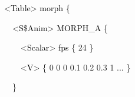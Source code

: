 \documentclass[a4paper]{article}
\newcommand\textstyleOOoComputerKeyWord[1]{\textrm{\textcolor[rgb]{0.0,0.0,0.5019608}{#1}}}
\newcommand\textstyleOOoAssemblerSpecialChar[1]{\textrm{\textcolor[rgb]{0.0,0.5019608,0.0}{#1}}}
\newcommand\textstyleOOoAssemblerIdent[1]{\textrm{\textcolor{black}{#1}}}
\newcommand\textstyleOOoAssemblerLiteral[1]{\textrm{\textcolor[rgb]{0.49803922,0.0,0.49803922}{#1}}}
\begin{document}
{\color{black}
\textstyleOOoComputerKeyWord{\textcolor{black}{\ \ \ \ }}\textstyleOOoAssemblerSpecialChar{{\textless}}\textstyleOOoAssemblerIdent{Table}\textstyleOOoAssemblerSpecialChar{{\textgreater}}\textstyleOOoComputerKeyWord{\textcolor{black}{
}}\textstyleOOoAssemblerIdent{morph}\textstyleOOoComputerKeyWord{\textcolor{black}{
}}\textstyleOOoAssemblerSpecialChar{\{}}

{\color{black}
\textstyleOOoComputerKeyWord{\textcolor{black}{\ \ \ \ \ \ }}\textstyleOOoAssemblerSpecialChar{{\textless}}\textstyleOOoAssemblerIdent{S}\textstyleOOoAssemblerSpecialChar{\$}\textstyleOOoAssemblerIdent{Anim}\textstyleOOoAssemblerSpecialChar{{\textgreater}}\textstyleOOoComputerKeyWord{\textcolor{black}{
}}\textstyleOOoAssemblerIdent{MORPH\_A}\textstyleOOoComputerKeyWord{\textcolor{black}{
}}\textstyleOOoAssemblerSpecialChar{\{}}

{\color{black}
\textstyleOOoComputerKeyWord{\textcolor{black}{\ \ \ \ \ \ \ \ }}\textstyleOOoAssemblerSpecialChar{{\textless}}\textstyleOOoAssemblerIdent{Scalar}\textstyleOOoAssemblerSpecialChar{{\textgreater}}\textstyleOOoComputerKeyWord{\textcolor{black}{
}}\textstyleOOoAssemblerIdent{fps}\textstyleOOoComputerKeyWord{\textcolor{black}{
}}\textstyleOOoAssemblerSpecialChar{\{}\textstyleOOoComputerKeyWord{\textcolor{black}{
}}\textstyleOOoAssemblerLiteral{24}\textstyleOOoComputerKeyWord{\textcolor{black}{
}}\textstyleOOoAssemblerSpecialChar{\}}}

{\color{black}
\textstyleOOoComputerKeyWord{\textcolor{black}{\ \ \ \ \ \ \ \ }}\textstyleOOoAssemblerSpecialChar{{\textless}}\textstyleOOoAssemblerIdent{V}\textstyleOOoAssemblerSpecialChar{{\textgreater}}\textstyleOOoComputerKeyWord{\textcolor{black}{
}}\textstyleOOoAssemblerSpecialChar{\{}\textstyleOOoComputerKeyWord{\textcolor{black}{
}}\textstyleOOoAssemblerLiteral{0}\textstyleOOoComputerKeyWord{\textcolor{black}{
}}\textstyleOOoAssemblerLiteral{0}\textstyleOOoComputerKeyWord{\textcolor{black}{
}}\textstyleOOoAssemblerLiteral{0}\textstyleOOoComputerKeyWord{\textcolor{black}{
}}\textstyleOOoAssemblerLiteral{0.1}\textstyleOOoComputerKeyWord{\textcolor{black}{
}}\textstyleOOoAssemblerLiteral{0.2}\textstyleOOoComputerKeyWord{\textcolor{black}{
}}\textstyleOOoAssemblerLiteral{0.3}\textstyleOOoComputerKeyWord{\textcolor{black}{
}}\textstyleOOoAssemblerLiteral{1}\textstyleOOoComputerKeyWord{\textcolor{black}{
}}\textstyleOOoAssemblerIdent{...}\textstyleOOoComputerKeyWord{\textcolor{black}{
}}\textstyleOOoAssemblerSpecialChar{\}}}

{\color{black}
\textstyleOOoComputerKeyWord{\textcolor{black}{\ \ \ \ \ \ }}\textstyleOOoAssemblerSpecialChar{\}}}
\end{document}
